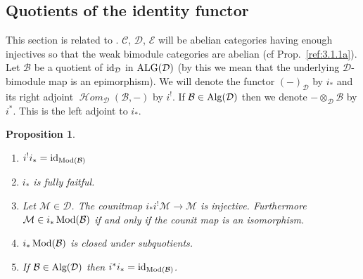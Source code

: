 \documentclass{amsproc}
\def\Bscr{{\mathcal B}}
\def\Cscr{{\mathcal C}}
\def\Dscr{{\mathcal D}}
\def\Escr{{\mathcal E}}
\def\Hscr{{\mathcal H}}
\def\Mscr{{\mathcal M}}
\def\HHom{\operatorname {\Hscr \mathit{om}}}
\def\Id{\text{id}}
\def\Mod{\mathop{\text{Mod}}}
\def\Alg{\mathop{\text{Alg}}}
\def\ALG{\mathop{\text{ALG}}}
\def\HHom{\operatorname {\Hscr \mathit{om}}}
\def\r{\rightarrow}
\let\oldtext\text
\def\text#1{\oldtext{\upshape #1}}
\newtheorem{propositions}[lemmas]{Proposition}
\theoremstyle{definition}
\theoremstyle{remark}
\numberwithin{equation}{section}
\numberwithin{table}{section}
\numberwithin{figure}{section}
\begin{document}
\subsection{Quotients of the identity functor} 
\label{ref:3.4b}
This section is related
to \cite{rosenberg}. $\Cscr$, $\Dscr$, $\Escr$ will
be abelian categories having enough injectives so that the weak
bimodule categories are abelian (cf Prop.\ \ref{ref:3.1.1a}).  Let
$\Bscr$ be a quotient of $\Id_\Dscr$ in $\ALG(\Dscr)$ (by this we mean
that the underlying $\Dscr$-bimodule map is an epimorphism). We will
denote the functor $(-)_\Dscr$ by $i_\ast$ and its right adjoint
$\HHom_\Dscr(\Bscr,-)$ by $i^!$. If $\Bscr\in\Alg(\Dscr)$ then we
denote $-\otimes_\Dscr\Bscr$ by $i^\ast$. This is the left adjoint to
$i_\ast$.
\begin{propositions}
\label{ref:3.4.1a}
\begin{enumerate}
\item $i^!i_\ast=\Id_{\Mod(\Bscr)}$
\item $i_\ast$ is fully faitful.
\item Let $\Mscr\in\Dscr$. The counitmap $i_\ast i^!\Mscr\r \Mscr$ is
  injective. Furthermore $\Mscr\in i_\ast\Mod(\Bscr)$ if and only if
  the counit map is an isomorphism.
\item $i_\ast\Mod(\Bscr)$ is  closed
under subquotients.
\item If $\Bscr\in\Alg(\Dscr)$ then $i^\ast i_\ast=\Id_{\Mod(\Bscr)}$.
\end{enumerate}
\end{propositions}
\end{document}

